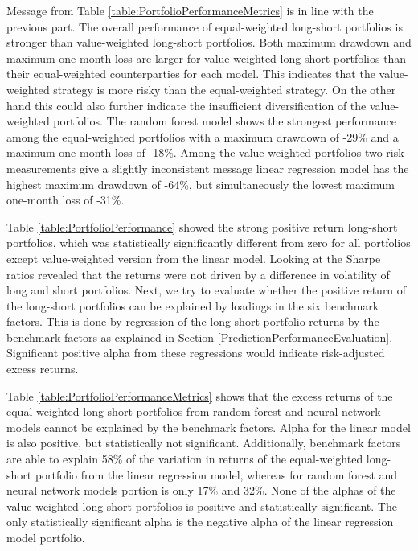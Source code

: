 \documentclass[12pt]{article}
\begin{document}
Message from Table \ref{table:PortfolioPerformanceMetrics} is in line with the previous part. The overall performance of equal-weighted long-short portfolios is stronger than value-weighted long-short portfolios. Both maximum drawdown and maximum one-month loss are larger for value-weighted long-short portfolios than their equal-weighted counterparties for each model. This indicates that the value-weighted strategy is more risky than the equal-weighted strategy. On the other hand this could also further indicate the insufficient diversification of the value-weighted portfolios. The random forest model shows the strongest performance among the equal-weighted portfolios with a maximum drawdown of -29\% and a maximum one-month loss of -18\%. Among the value-weighted portfolios two risk measurements give a slightly inconsistent message linear regression model has the highest maximum drawdown of -64\%, but simultaneously the lowest maximum one-month loss of -31\%. \par

Table \ref{table:PortfolioPerformance} showed the strong positive return long-short portfolios, which was statistically significantly different from zero for all portfolios except value-weighted version from the linear model. Looking at the Sharpe ratios revealed that the returns were not driven by a difference in volatility of long and short portfolios. Next, we try to evaluate whether the positive return of the long-short portfolios can be explained by loadings in the six benchmark factors. This is done by regression of the long-short portfolio returns by the benchmark factors as explained in Section \ref{PredictionPerformanceEvaluation}. Significant positive alpha from these regressions would indicate risk-adjusted excess returns. \par

Table \ref{table:PortfolioPerformanceMetrics} shows that the excess returns of the equal-weighted long-short portfolios from random forest and neural network models cannot be explained by the benchmark factors. Alpha for the linear model is also positive, but statistically not significant. Additionally, benchmark factors are able to explain 58\% of the variation in returns of the equal-weighted long-short portfolio from the linear regression model, whereas for random forest and neural network models portion is only 17\% and 32\%. None of the alphas of the value-weighted long-short portfolios is positive and statistically significant. The only statistically significant alpha is the negative alpha of the linear regression model portfolio. \par
\end{document}
